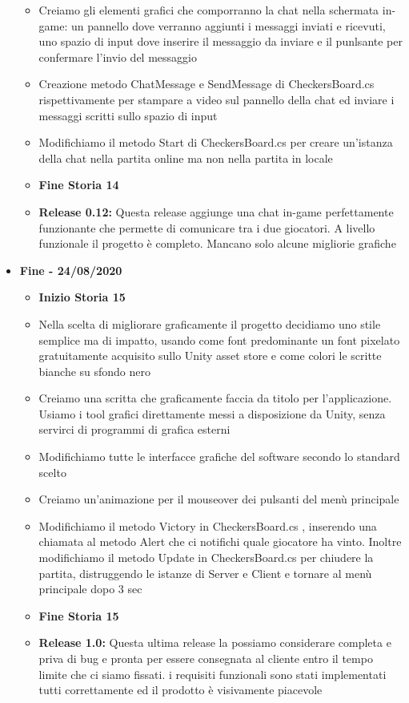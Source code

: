 \documentclass[12pt]{article}
\begin{document}
\begin{itemize}
\begin{itemize}
	\item Creiamo gli elementi grafici che comporranno la chat nella schermata in-game: un pannello dove verranno aggiunti i messaggi inviati e ricevuti, uno spazio di input dove inserire il messaggio da inviare e il punlsante per confermare l'invio del messaggio
	\item Creazione metodo ChatMessage e SendMessage di CheckersBoard.cs rispettivamente per stampare a video sul pannello della chat ed inviare i messaggi scritti sullo spazio di input
	\item Modifichiamo il metodo Start di CheckersBoard.cs per creare un'istanza della chat nella partita online ma non nella partita in locale
	\item \textbf{Fine Storia 14}
	\item \textbf{Release 0.12:} Questa release aggiunge una chat in-game perfettamente funzionante che permette di comunicare tra i due giocatori. A livello funzionale il progetto è completo. Mancano solo alcune migliorie grafiche
	\end{itemize}
\item \textbf{Fine - 24/08/2020}
	\begin{itemize}
	\item \textbf{Inizio Storia 15}
	\item Nella scelta di migliorare graficamente il progetto decidiamo uno stile semplice ma di impatto, usando come font predominante un font pixelato gratuitamente acquisito sullo Unity asset store e come colori le scritte bianche su sfondo nero
	\item Creiamo una scritta che graficamente faccia da titolo per l'applicazione. Usiamo i tool grafici direttamente messi a disposizione da Unity, senza servirci di programmi di grafica esterni
	\item Modifichiamo tutte le interfacce grafiche del software secondo lo standard scelto
	\item Creiamo un'animazione per il mouseover dei pulsanti del menù principale
	\item Modifichiamo il metodo Victory in CheckersBoard.cs , inserendo una chiamata al metodo Alert che ci notifichi quale giocatore ha vinto. Inoltre modifichiamo il metodo Update in CheckersBoard.cs per chiudere la partita, distruggendo le istanze di Server e Client e tornare al menù principale dopo 3 sec
	\item \textbf{Fine Storia 15} 
	\item \textbf{Release 1.0:} Questa ultima release la possiamo considerare completa e priva di bug e pronta per essere consegnata al cliente entro il tempo limite che ci siamo fissati. i requisiti funzionali sono stati implementati tutti correttamente ed il prodotto è visivamente piacevole
	\end{itemize}
\end{itemize}
\end{document}
